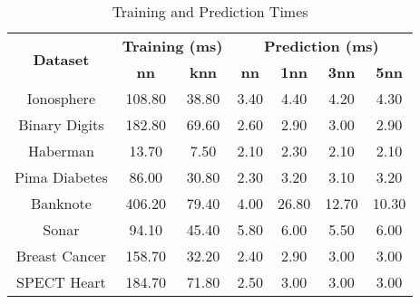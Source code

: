 \begin{table}[htbp]
\caption{Training and Prediction Times}
\begin{center}
\begin{tabular}{|c|c|c|c|c|c|c|}
\hline
\multirow{2}{*}{\textbf{Dataset}} & \multicolumn{2}{c|}{\textbf{Training (ms)}} & \multicolumn{4}{c|}{\textbf{Prediction (ms)}} \\ \cline{2-7}
 & \textbf{nn} & \textbf{knn} & \textbf{nn} & \textbf{1nn} & \textbf{3nn} & \textbf{5nn} \\ \hline
Ionosphere & 108.80 & 38.80 & 3.40 & 4.40 & 4.20 & 4.30 \\ \hline
Binary Digits & 182.80 & 69.60 & 2.60 & 2.90 & 3.00 & 2.90 \\ \hline
Haberman & 13.70 & 7.50 & 2.10 & 2.30 & 2.10 & 2.10 \\ \hline
Pima Diabetes & 86.00 & 30.80 & 2.30 & 3.20 & 3.10 & 3.20 \\ \hline
Banknote & 406.20 & 79.40 & 4.00 & 26.80 & 12.70 & 10.30 \\ \hline
Sonar & 94.10 & 45.40 & 5.80 & 6.00 & 5.50 & 6.00 \\ \hline
Breast Cancer & 158.70 & 32.20 & 2.40 & 2.90 & 3.00 & 3.00 \\ \hline
SPECT Heart & 184.70 & 71.80 & 2.50 & 3.00 & 3.00 & 3.00 \\ \hline
\end{tabular}
\label{tab:timing}
\end{center}
\end{table}